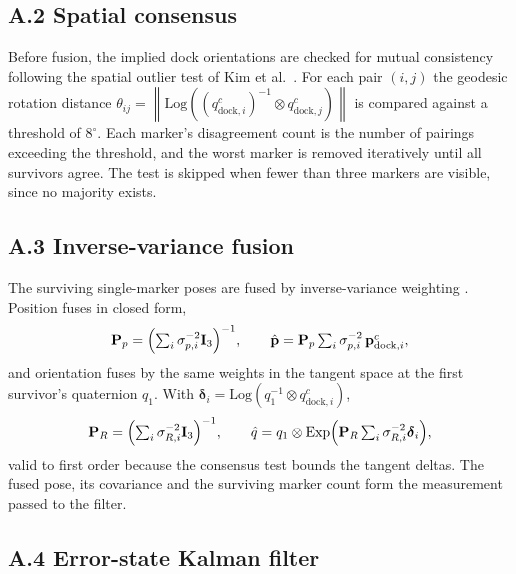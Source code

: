 \subsection*{A.2 Spatial consensus}

Before fusion, the implied dock orientations are checked for mutual consistency following the spatial outlier test of Kim et al.\ \cite{kim2024enhancing}. For each pair $(i,j)$ the geodesic rotation distance $\theta_{ij} = \left\| \mathrm{Log}\!\left((q_{\mathrm{dock},i}^{c})^{-1} \otimes q_{\mathrm{dock},j}^{c}\right) \right\|$ is compared against a threshold of $8^{\circ}$. Each marker's disagreement count is the number of pairings exceeding the threshold, and the worst marker is removed iteratively until all survivors agree. The test is skipped when fewer than three markers are visible, since no majority exists.

\subsection*{A.3 Inverse-variance fusion}

The surviving single-marker poses are fused by inverse-variance weighting \cite{xu2021underwater}. Position fuses in closed form,
\begin{equation}
    \mathbf{P}_p = \Bigl(\textstyle\sum_i \sigma_{p,i}^{-2}\mathbf{I}_3\Bigr)^{-1}, \qquad
    \hat{\mathbf{p}} = \mathbf{P}_p \textstyle\sum_i \sigma_{p,i}^{-2}\,\mathbf{p}_{\mathrm{dock},i}^{c},
\end{equation}
and orientation fuses by the same weights in the tangent space at the first survivor's quaternion $q_1$. With $\boldsymbol{\delta}_i = \mathrm{Log}(q_1^{-1} \otimes q_{\mathrm{dock},i}^{c})$,
\begin{equation}
    \mathbf{P}_R = \Bigl(\textstyle\sum_i \sigma_{R,i}^{-2}\mathbf{I}_3\Bigr)^{-1}, \qquad
    \hat{q} = q_1 \otimes \mathrm{Exp}\Bigl(\mathbf{P}_R \textstyle\sum_i \sigma_{R,i}^{-2}\boldsymbol{\delta}_i\Bigr),
\end{equation}
valid to first order because the consensus test bounds the tangent deltas. The fused pose, its covariance and the surviving marker count form the measurement passed to the filter.

\subsection*{A.4 Error-state Kalman filter}

